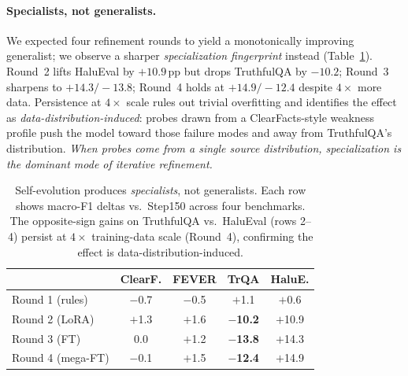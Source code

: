 \documentclass{article}
\begin{document}
\paragraph{Specialists, not generalists.}
We expected four refinement rounds to yield a monotonically improving generalist; we observe a sharper \emph{specialization fingerprint} instead (Table~\ref{tab:specialization}).
Round~2 lifts HaluEval by $+10.9$\,pp but drops TruthfulQA by $-10.2$; Round~3 sharpens to $+14.3 / -13.8$; Round~4 holds at $+14.9 / -12.4$ despite $4\times$ more data.
Persistence at $4\times$ scale rules out trivial overfitting and identifies the effect as \emph{data-distribution-induced}: probes drawn from a ClearFacts-style weakness profile push the model toward those failure modes and away from TruthfulQA's distribution.
\emph{When probes come from a single source distribution, specialization is the dominant mode of iterative refinement.}

\begin{table}[h]
\centering
\footnotesize
\caption{Self-evolution produces \emph{specialists}, not generalists. Each row shows macro-F1 deltas vs.\ Step150 across four benchmarks. The opposite-sign gains on TruthfulQA vs.\ HaluEval (rows 2--4) persist at $4\times$ training-data scale (Round~4), confirming the effect is data-distribution-induced.}
\label{tab:specialization}
\setlength{\tabcolsep}{3pt}
\begin{tabular}{@{}lcccc@{}}
\toprule
& \textbf{ClearF.} & \textbf{FEVER} & \textbf{TrQA} & \textbf{HaluE.} \\
\midrule
Round 1 (rules)    & $-$0.7 & $-$0.5 & $+$1.1 & $+$0.6 \\
Round 2 (LoRA)     & $+$1.3 & $+$1.6 & \textbf{$-$10.2} & $+$10.9 \\
Round 3 (FT)       & 0.0    & $+$1.2 & \textbf{$-$13.8} & $+$14.3 \\
Round 4 (mega-FT)  & $-$0.1 & $+$1.5 & \textbf{$-$12.4} & $+$14.9 \\
\bottomrule
\end{tabular}
\end{table}
\end{document}
